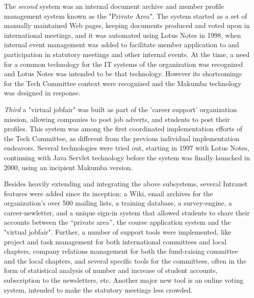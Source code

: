 \documentclass{acm_proc_article-sp}
\begin{document}
The {\it second} system was an internal document archive and member profile management system known as the "Private Area". The system started as a set of manually maintained Web pages, keeping documents produced and voted upon in international meetings, and it was automated using Lotus Notes in 1998, when internal event management was added to facilitate member application to and participation in statutory meetings and other internal events. At the time, a need for a common technology for the IT systems of the organization was recognized and Lotus Notes was intended to be that technology. However its shortcomings for the Tech Committee context were recognized and the Makumba technology was designed in response.

{\it Third} a "virtual jobfair" was built as part of the 'career support' organization mission,  allowing companies to post job adverts, and students to post their profiles. This system was among the first coordinated implementation efforts of the Tech Committee, as different from the previous individual implementation endeavors. Several technologies were tried out, starting in 1997 with Lotus Notes, continuing with Java Servlet technology before the system was finally launched in 2000, using an incipient Makumba version.

Besides heavily extending and integrating the above subsystems, several Intranet features were added since its inception: a Wiki, email archives for the organization's over 500 mailing lists, a training database, a survey-engine, a career-newletter, and a unique sign-in system that allowed students to share their accounts between the ``private area'', the course application system and the "virtual jobfair". Further, a number of support tools were implemented, like project and task management for both international committees and local chapters, company relations management for both the fund-raising committee and the local chapters, and several specific tools for the committees, often in the form of statistical analysis of number and increase of student accounts, subscription to the newsletters, etc. Another major new tool is an online voting system, intended to make the statutory meetings less crowded.
\end{document}
